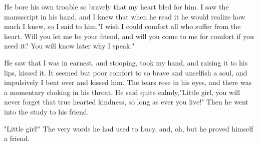 He bore his own trouble so bravely that my heart bled for him. I saw the manuscript in his hand, and I knew that when he read it he would realize how much I knew, so I said to him,"I wish I could comfort all who suffer from the heart. Will you let me be your friend, and will you come to me for comfort if you need it? You will know later why I speak." 

He saw that I was in earnest, and stooping, took my hand, and raising it to his lips, kissed it. It seemed but poor comfort to so brave and unselfish a soul, and impulsively I bent over and kissed him. The tears rose in his eyes, and there was a momentary choking in his throat. He said quite calmly,"Little girl, you will never forget that true hearted kindness, so long as ever you live!" Then he went into the study to his friend. 

"Little girl!" The very words he had used to Lucy, and, oh, but he proved himself a friend. 
